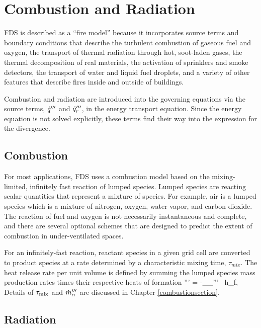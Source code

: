 \section{Combustion and Radiation}

FDS is described as a ``fire model'' because it incorporates source terms and boundary conditions that describe the
turbulent combustion of gaseous fuel and oxygen, the transport of thermal radiation through hot, soot-laden gases, the
thermal decomposition of real materials, the activation of sprinklers and smoke detectors, the transport of water and liquid fuel
droplets, and a variety of other features that describe fires inside and outside of buildings.

Combustion and radiation are introduced into the governing equations via the source terms, $\dot{q}^{\prime\prime\prime}$ and $\dot{q}_r^{\prime\prime\prime}$,
in the energy transport equation. Since the energy equation is not solved explicitly, these terms find their way into the
expression for the divergence.

\subsection{Combustion}

For most applications, FDS uses a combustion model based on the mixing-limited, infinitely fast reaction of lumped species.
Lumped species are reacting scalar quantities that represent a mixture of species.  For example, air is a lumped species which is a mixture of
nitrogen, oxygen, water vapor, and carbon dioxide.  The reaction of fuel and oxygen is not necessarily instantaneous and
complete, and there are several optional schemes that are designed to predict the extent of combustion in under-ventilated spaces.

For an infinitely-fast reaction, reactant species in a given grid cell are converted to product species at a rate determined by a
characteristic mixing time, $\tau_{mix}$. The heat release rate per unit volume is defined by summing the lumped species mass production rates times their respective heats of formation
\be
   \dq''' = -\sum_\alpha \dm_\alpha''' \, \Delta h_{\rm f,\alpha} \label{EDC1}
\ee  %
Details of $\tau_{\rm mix}$ and $\dot{m}_\alpha'''$ are discussed in Chapter \ref{combustionsection}.

\subsection{Radiation}

